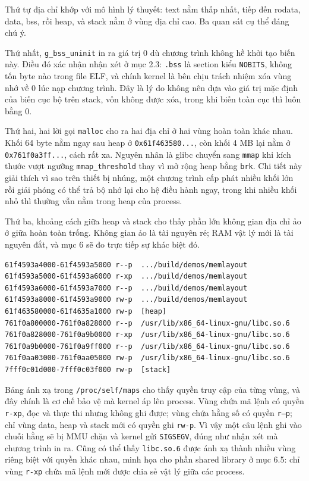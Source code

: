 \documentclass[11pt]{article}
\newcommand{\code}[1]{\texttt{#1}}
\begin{document}
Thứ tự địa chỉ khớp với mô hình lý thuyết: text nằm thấp nhất, tiếp đến rodata, data, bss, rồi heap, và stack nằm ở vùng địa chỉ cao. Ba quan sát cụ thể đáng chú ý.

Thứ nhất, \code{g\_bss\_uninit} in ra giá trị 0 dù chương trình không hề khởi tạo biến này. Điều đó xác nhận nhận xét ở mục 2.3: \code{.bss} là section kiểu \code{NOBITS}, không tốn byte nào trong file ELF, và chính kernel là bên chịu trách nhiệm xóa vùng nhớ về 0 lúc nạp chương trình. Đây là lý do không nên dựa vào giá trị mặc định của biến cục bộ trên stack, vốn không được xóa, trong khi biến toàn cục thì luôn bằng 0.

Thứ hai, hai lời gọi \code{malloc} cho ra hai địa chỉ ở hai vùng hoàn toàn khác nhau. Khối 64 byte nằm ngay sau heap ở \code{0x61f463580...}, còn khối 4 MB lại nằm ở \code{0x761f0a3ff...}, cách rất xa. Nguyên nhân là glibc chuyển sang \code{mmap} khi kích thước vượt ngưỡng \code{mmap\_threshold} thay vì mở rộng heap bằng \code{brk}. Chi tiết này giải thích vì sao trên thiết bị nhúng, một chương trình cấp phát nhiều khối lớn rồi giải phóng có thể trả bộ nhớ lại cho hệ điều hành ngay, trong khi nhiều khối nhỏ thì thường vẫn nằm trong heap của process.

Thứ ba, khoảng cách giữa heap và stack cho thấy phần lớn không gian địa chỉ ảo ở giữa hoàn toàn trống. Không gian ảo là tài nguyên rẻ; RAM vật lý mới là tài nguyên đắt, và mục 6 sẽ đo trực tiếp sự khác biệt đó.

\begin{lstlisting}[caption={Trích \code{/proc/self/maps} của cùng process}]
61f4593a4000-61f4593a5000 r--p  .../build/demos/memlayout
61f4593a5000-61f4593a6000 r-xp  .../build/demos/memlayout
61f4593a6000-61f4593a7000 r--p  .../build/demos/memlayout
61f4593a8000-61f4593a9000 rw-p  .../build/demos/memlayout
61f463580000-61f4635a1000 rw-p  [heap]
761f0a800000-761f0a828000 r--p  /usr/lib/x86_64-linux-gnu/libc.so.6
761f0a828000-761f0a9b0000 r-xp  /usr/lib/x86_64-linux-gnu/libc.so.6
761f0a9b0000-761f0a9ff000 r--p  /usr/lib/x86_64-linux-gnu/libc.so.6
761f0aa03000-761f0aa05000 rw-p  /usr/lib/x86_64-linux-gnu/libc.so.6
7fff0c01d000-7fff0c03f000 rw-p  [stack]
\end{lstlisting}

Bảng ánh xạ trong \code{/proc/self/maps} cho thấy quyền truy cập của từng vùng, và đây chính là cơ chế bảo vệ mà kernel áp lên process. Vùng chứa mã lệnh có quyền \code{r-xp}, đọc và thực thi nhưng không ghi được; vùng chứa hằng số có quyền \code{r--p}; chỉ vùng data, heap và stack mới có quyền ghi \code{rw-p}. Vì vậy một câu lệnh ghi vào chuỗi hằng sẽ bị MMU chặn và kernel gửi \code{SIGSEGV}, đúng như nhận xét mà chương trình in ra. Cũng có thể thấy \code{libc.so.6} được ánh xạ thành nhiều vùng riêng biệt với quyền khác nhau, minh họa cho phần shared library ở mục 6.5: chỉ vùng \code{r-xp} chứa mã lệnh mới được chia sẻ vật lý giữa các process.
\end{document}
